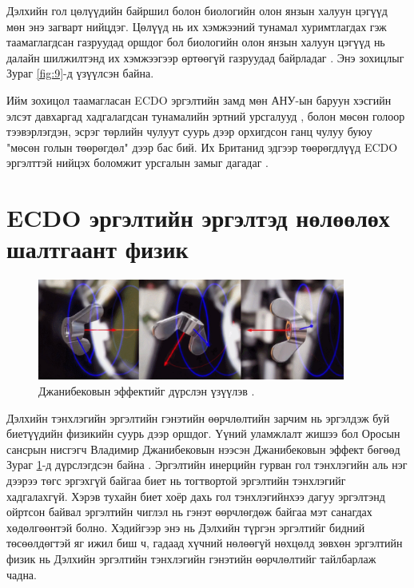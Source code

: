 \documentclass[10pt,twocolumn,letterpaper]{article}
\begin{document}
Дэлхийн гол цөлүүдийн байршил болон биологийн олон янзын халуун цэгүүд мөн энэ загварт нийцдэг. Цөлүүд нь их хэмжээний тунамал хуримтлагдах гэж таамаглагдсан газруудад оршдог бол биологийн олон янзын халуун цэгүүд нь далайн шилжилтэнд их хэмжээгээр өртөөгүй газруудад байрладаг \cite{28}. Энэ зохицлыг Зураг \ref{fig:9}-д үзүүлсэн байна.

Ийм зохицол таамагласан ECDO эргэлтийн замд мөн АНУ-ын баруун хэсгийн элсэт давхаргад хадгалагдсан тунамалийн эртний урсгалууд \cite{21}, болон мөсөн голоор тээвэрлэгдэн, эсрэг төрлийн чулуут суурь дээр орхигдсон ганц чулуу буюу "мөсөн голын төөрөгдөл" дээр бас бий. Их Британид эдгээр төөрөгдлүүд ECDO эргэлттэй нийцэх боломжит урсгалын замыг дагадаг \cite{67,68}.

\section{ECDO эргэлтийн эргэлтэд нөлөөлөх шалтгаант физик}

\begin{figure}
\begin{center}
\includegraphics[width=0.9\textwidth]{dzhani.jpg}
\end{center}
   \caption{Джанибековын эффектийг дүрслэн үзүүлэв \cite{28}.}
\label{fig:10}
\end{figure}

Дэлхийн тэнхлэгийн эргэлтийн гэнэтийн өөрчлөлтийн зарчим нь эргэлдэж буй биетүүдийн физикийн суурь дээр оршдог. Үүний уламжлалт жишээ бол Оросын сансрын нисгэгч Владимир Джанибековын нээсэн Джанибековын эффект бөгөөд Зураг \ref{fig:10}-д дүрслэгдсэн байна \cite{37}. Эргэлтийн инерцийн гурван гол тэнхлэгийн аль нэг дээрээ төгс эргэхгүй байгаа биет нь тогтвортой эргэлтийн тэнхлэгийг хадгалахгүй. Хэрэв тухайн биет хоёр дахь гол тэнхлэгийнхээ дагуу эргэлтэнд ойртсон байвал эргэлтийн чиглэл нь гэнэт өөрчлөгдөж байгаа мэт санагдах хөдөлгөөнтэй болно. Хэдийгээр энэ нь Дэлхийн түргэн эргэлтийг бидний төсөөлдөгтэй яг ижил биш ч, гадаад хүчний нөлөөгүй нөхцөлд зөвхөн эргэлтийн физик нь Дэлхийн эргэлтийн тэнхлэгийн гэнэтийн өөрчлөлтийг тайлбарлаж чадна.
\end{document}
